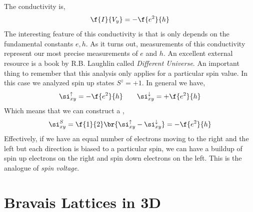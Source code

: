 \documentclass{article}
\begin{document}
The conductivity is,
\[ \f{I}{V_{y}} = - \f{e^2}{h} \]
The interesting feature of this conductivity is that is only depends on the fundamental constants $e, h$. As it turns out, measurements of this conductivity represent our most precise measurements of $e$ and $h$. An excellent external resource is a book by R.B. Laughlin called \textit{Different Universe}. An important thing to remember that this analysis only applies for a particular spin value. In this case we analyzed spin up states $S^{z} = +1$. In general we have,
\[ \si_{xy}^{\uparrow} = -\f{e^2}{h} \qquad \si_{xy}^{\downarrow} = +\f{e^2}{h} \]
Which means that we can construct a ,
\[ \si_{xy}^{S} =\f{1}{2} \br{\si_{xy}^{\uparrow} - \si_{xy}^{\downarrow}} = - \f{e^2}{h} \]
Effectively, if we have an equal number of electrons moving to the right and the left but each direction is biased to a particular spin, we can have a buildup of spin up electrons on the right and spin down electrons on the left. This is the analogue of \textit{spin voltage}. \\

\section{Bravais Lattices in 3D}
\end{document}
